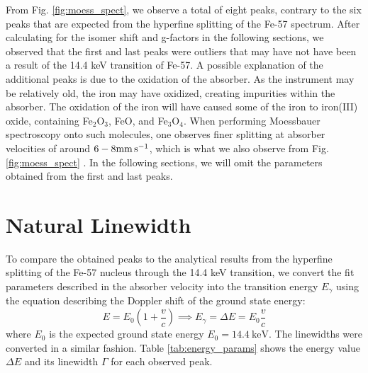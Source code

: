 \documentclass[a4paper]{report}
\numberwithin{equation}{section}
\begin{document}
From Fig. \ref{fig:moess_spect}, we observe a total of eight peaks, contrary to the 
six peaks that are expected from the hyperfine splitting of the Fe-57 spectrum. After calculating for the isomer shift and 
g-factors in the following sections, we observed that the first and last peaks were outliers that may have not have been a result of  
 the 14.4 keV transition of Fe-57. 
A possible explanation of the additional peaks is due to the oxidation of the absorber. As the instrument may be relatively old,
the iron may have oxidized, creating impurities within the absorber. The oxidation of the iron will have caused some of the iron
to iron(III) oxide, containing Fe$_2$O$_3$, FeO, and Fe$_3$O$_4$. When performing Moessbauer spectroscopy onto such molecules, 
one observes finer splitting at absorber velocities of around $6-8\si[]{\milli\metre\per\second}$, which is what we also 
observe from Fig. \ref{fig:moess_spect} \cite{Winsett2019}. In the following sections, we will omit the parameters obtained from 
the first and last peaks. \par 

\section{Natural Linewidth}

To compare the obtained peaks to the analytical results from the hyperfine splitting of the Fe-57 nucleus through the 14.4 keV
transition, we convert the fit parameters described in the absorber velocity into the transition energy $E_\gamma$ using the 
equation describing the Doppler shift of the ground state energy: 
\begin{equation}
    E = E_0 \left(1 + \frac{v}{c}\right) \implies E_\gamma = \Delta E = E_0\frac{v}{c}
\end{equation}
where $E_0$ is the expected ground state energy $E_0 = \SI{14.4}{\kilo\electronvolt}$. The linewidths were converted in a similar 
fashion. Table \ref{tab:energy_params} shows the energy value $\Delta E$ and its 
linewidth $\Gamma$ for each observed peak. 
\end{document}
